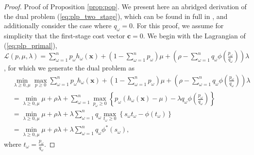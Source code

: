 \documentclass[opre,nonblindrev]{informs3} %
\newcommand{\x}{\mathbf{x}}
\renewcommand{\c}{\mathbf{c}}
\begin{document}
\begin{proof}{\sc Proof of Proposition \ref{prop:pop}.}
	We present here an abridged derivation of the dual problem (\ref{eq:plp_two_stage}), which can be found in full in \cite{bental2011robust}, and additionally consider the case where $q_\omega = 0$.
	For this proof, we assume for simplicity that the first-stage cost vector $\c = 0$.	
	We begin with the Lagrangian of (\ref{eq:plp_primal}), $\mathcal{L}(p,\mu,\lambda) = \sum_{\omega=1}^n p_\omega h_\omega(\x) + \left( 1-\sum_{\omega=1}^n p_\omega \right)\mu + \left( \rho - \sum_{\omega=1}^n q_\omega \phi\left(\frac{p_\omega}{q_\omega}\right) \right)\lambda$, for which we generate the dual problem as
	\begin{align}
		 & \min_{\lambda \geq 0, \mu} \max_{p \geq 0} \sum_{\omega=1}^n p_\omega h_\omega(\x) + \left( 1-\sum_{\omega=1}^n p_\omega \right)\mu + \left( \rho - \sum_{\omega=1}^n q_\omega \phi\left(\frac{p_\omega}{q_\omega}\right) \right)\lambda \nonumber \\
		& = \min_{\lambda \geq 0, \mu} \mu + \rho\lambda + \sum_{\omega=1}^n \max_{p_\omega \geq 0} \left\{ p_\omega (h_\omega(\x) - \mu) - \lambda q_\omega \phi\left(\frac{p_\omega}{q_\omega}\right) \right\} \label{eq:pop_proof_detail_1} \\
		& =  \min_{\lambda \geq 0, \mu} \mu + \rho\lambda + \lambda \sum_{\omega=1}^n q_\omega \max_{t_\omega \geq 0} \left\{ s_\omega t_\omega - \phi(t_\omega) \right\} \label{eq:pop_proof_detail_2} \\
		& = \min_{\lambda \geq 0, \mu} \mu + \rho\lambda + \lambda \sum_{\omega=1}^n q_\omega \phi^*\left(s_\omega\right), \nonumber
	\end{align}
	where $t_\omega = \frac{p_\omega}{q_\omega}$.
	

\end{proof}
\end{document}
